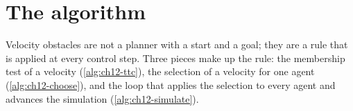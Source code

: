 \section{The algorithm}
\label{sec:ch12-algorithm}

Velocity obstacles are not a planner with a start and a goal; they are a rule
that is applied at every control step. Three pieces make up the rule: the
membership test of a velocity (\cref{alg:ch12-ttc}), the selection of a
velocity for one agent (\cref{alg:ch12-choose}), and the loop that applies the
selection to every agent and advances the simulation (\cref{alg:ch12-simulate}).

\begin{algorithm}[htb]
\caption{Time to collision and membership in the truncated velocity obstacle}
\label{alg:ch12-ttc}
\end{algorithm}

